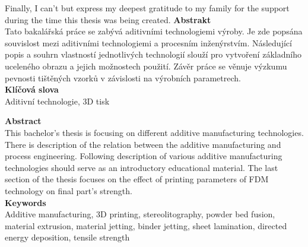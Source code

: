 \documentclass[a4paper, twoside, 11pt]{report}
\begin{document}
	
	Finally, I can't but express my deepest gratitude to my family for the support during the time this thesis was being created.
%
%
%
\newpage
\LARGE
\noindent
\textbf{Abstrakt}
\normalsize
\\[10pt]
Tato bakalářská práce se zabývá aditivními technologiemi výroby. Je zde popsána souvislost mezi aditivními technologiemi a procesním inženýrstvím. Následující popis a souhrn vlastností jednotlivých technologií slouží pro vytvoření základního uceleného obrazu a jejich možnostech použití. Závěr práce se věnuje výzkumu pevnosti tištěných vzorků v závislosti na výrobních parametrech.
\\[20pt]

\Large
\noindent
\textbf{Klíčová slova}
\normalsize
\\[10pt]
Aditivní technologie, 3D tisk

\vfill
\LARGE
\noindent
\textbf{Abstract}
\normalsize
\\[10pt]
This bachelor's thesis is focusing on different additive manufacturing technologies. There is description of the relation between the additive manufacturing and process engineering. Following description of various additive manufacturing technologies should serve as an introductory educational material. The last section of the thesis focuses on the effect of printing parameters of FDM technology on final part's strength.
\\[20pt]

\Large
\noindent
\textbf{Keywords}
\normalsize
\\[10pt]
Additive manufacturing, 3D printing, stereolitography, powder bed fusion, material extrusion, material jetting, binder jetting, sheet lamination, directed energy deposition, tensile strength

\tableofcontents
\end{document}
